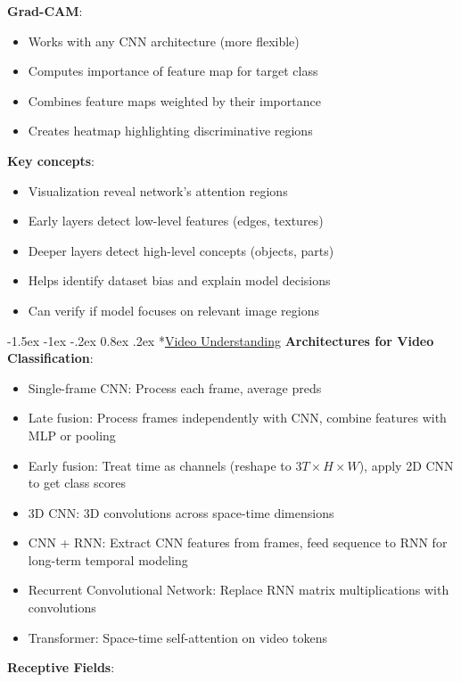 \documentclass{article}
\makeatletter
\renewcommand\section{\@startsection{section}{1}{\z@}%
                                  {-1.5ex \@plus -1ex \@minus -.2ex}%
                                  {0.8ex \@plus.2ex}%
                                  {\normalfont\small\bfseries}}
\makeatother
\begin{document}
\begin{multicols}{3}
\textbf{Grad-CAM}:
\begin{itemize}
\item Works with any CNN architecture (more flexible)
\item Computes importance of feature map for target class
\item Combines feature maps weighted by their importance
\item Creates heatmap highlighting discriminative regions
\end{itemize}

\textbf{Key concepts}:
\begin{itemize}
\item Visualization reveal network's attention regions
\item Early layers detect low-level features (edges, textures)
\item Deeper layers detect high-level concepts (objects, parts)
\item Helps identify dataset bias and explain model decisions
\item Can verify if model focuses on relevant image regions
\end{itemize}

\section*{\underline{Video Understanding}}
\textbf{Architectures for Video Classification}:
\begin{itemize}
\item Single-frame CNN: Process each frame, average preds
\item Late fusion: Process frames independently with CNN, combine features with MLP or pooling
\item Early fusion: Treat time as channels (reshape to $3T \times H \times W$), apply 2D CNN to get class scores
\item 3D CNN: 3D convolutions across space-time dimensions
\item CNN + RNN: Extract CNN features from frames, feed sequence to RNN for long-term temporal modeling
\item Recurrent Convolutional Network: Replace RNN matrix multiplications with convolutions
\item Transformer: Space-time self-attention on video tokens
\end{itemize}

\textbf{Receptive Fields}:


\end{multicols}
\end{document}
